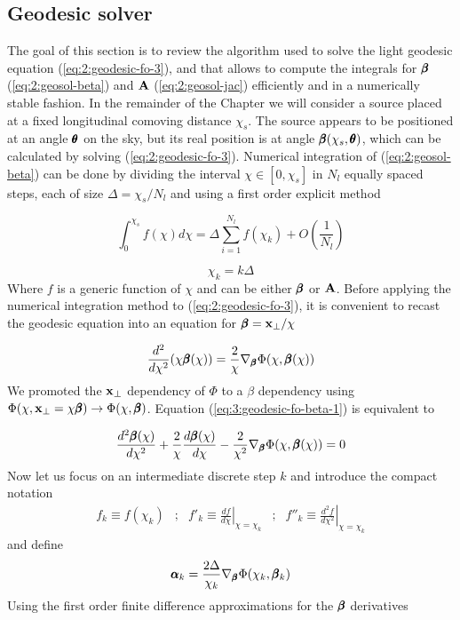 \subsection{Geodesic solver}
The goal of this section is to review the algorithm used to solve the light geodesic equation (\ref{eq:2:geodesic-fo-3}), and that allows to compute the integrals for $\pmb{\beta}$ (\ref{eq:2:geosol-beta}) and $\mathbf{A}$ (\ref{eq:2:geosol-jac}) efficiently and in a numerically stable fashion. In the remainder of the Chapter we will consider a source placed at a fixed longitudinal comoving distance $\chi_s$. The source appears to be positioned at an angle $\pmb{\theta}$ on the sky, but its real position is at angle $\pmb{\beta}(\chi_s,\pmb{\theta})$, which can be calculated by solving (\ref{eq:2:geodesic-fo-3}). Numerical integration of (\ref{eq:2:geosol-beta}) can be done by dividing the interval $\chi\in[0,\chi_s]$ in $N_l$ equally spaced steps, each of size $\Delta = \chi_s/N_l$ and using a first order explicit method

\begin{equation}
\label{eq:3:int-fo}
\int_0^{\chi_s} f(\chi)d\chi = \Delta\sum_{i=1}^{N_l}f(\chi_k) + O\left(\frac{1}{N_l}\right)
\end{equation} 

\begin{equation}
\label{eq:3:int-steps}
\chi_k = k\Delta
\end{equation}  
%
Where $f$ is a generic function of $\chi$ and can be either $\pmb{\beta}$ or $\mathbf{A}$. Before applying the numerical integration method to (\ref{eq:2:geodesic-fo-3}), it is convenient to recast the geodesic equation into an equation for $\pmb{\beta}=\mathbf{x}_\perp/\chi$ 

\begin{equation}
\label{eq:3:geodesic-fo-beta-1}
\frac{d^2}{d\chi^2}(\chi\pmb{\beta}(\chi)) = \frac{2}{\chi}\nabla_{\pmb{\beta}}\Phi(\chi,\pmb{\beta}(\chi))
\end{equation} 
%
We promoted the $\mathbf{x}_\perp$ dependency of $\Phi$ to a $\beta$ dependency using $\Phi(\chi,\mathbf{x}_\perp=\chi\pmb{\beta})\rightarrow\Phi(\chi,\pmb{\beta})$. Equation (\ref{eq:3:geodesic-fo-beta-1}) is equivalent to 

\begin{equation}
\label{eq:3:geodesic-fo-beta-2}
\frac{d^2\pmb{\beta}(\chi)}{d\chi^2} + \frac{2}{\chi}\frac{d\pmb{\beta}(\chi)}{d\chi} - \frac{2}{\chi^2}\nabla_{\pmb{\beta}}\Phi(\chi,\pmb{\beta}(\chi)) = 0
\end{equation}
%
Now let us focus on an intermediate discrete step $k$ and introduce the compact notation 
\begin{equation}
\label{eq:3:compactnotation}
\begin{matrix}
f_k\equiv f(\chi_k) & ; & f'_k\equiv\left.\frac{df}{d\chi}\right\vert_{\chi=\chi_k} & ; & f''_k\equiv\left.\frac{d^2f}{d\chi^2}\right\vert_{\chi=\chi_k}
\end{matrix}
\end{equation}  
%
and define
\begin{equation}
\label{eq:3:alphak}
\pmb{\alpha}_k = \frac{2\Delta}{\chi_k}\nabla_{\pmb{\beta}}\Phi(\chi_k,\pmb{\beta}_k)
\end{equation}
%
Using the first order finite difference approximations for the $\pmb{\beta}$ derivatives

